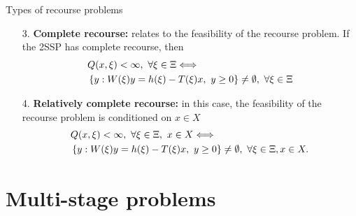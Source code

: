 \begin{frame}{Types of recourse problems}
	
	\begin{enumerate}[<+->]
		\item[3.] {\bf Complete recourse:} relates to the \alert{feasibility} of the recourse problem. If the 2SSP has complete recourse, then
		\begin{align*}
			& Q(x,\xi) < \infty, \ \forall \xi \in \Xi \Longleftrightarrow \\
			& \left\{ y : W(\xi)y = h(\xi) - T(\xi)x, \ y \ge 0 \right \} \neq \emptyset, \ \forall \xi \in \Xi 
		\end{align*}
	    \item[4.] {\bf Relatively complete recourse:} in this case, the feasibility of the recourse problem is \alert{conditioned} on $x \in X$
		\begin{align*}
			& Q(x,\xi) < \infty, \ \forall \xi \in \Xi, \ x \in X \Longleftrightarrow \\
			& \left\{ y : W(\xi)y = h(\xi) - T(\xi)x, \ y \ge 0 \right \} \neq \emptyset, \ \forall \xi \in \Xi, x \in X. 
		\end{align*}
	\end{enumerate}

	
\end{frame}


\section{Multi-stage problems}


